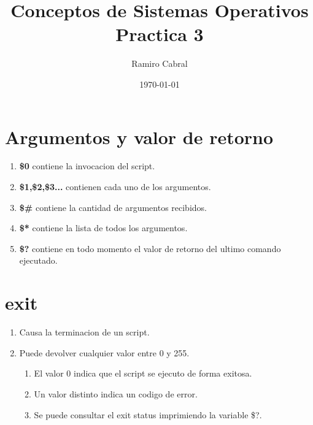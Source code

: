 \documentclass[11pt]{article}
\title{\Huge{Conceptos de Sistemas Operativos\\
Practica 3}}
\author{\huge{Ramiro Cabral}}
\date{\today}
\begin{document}
\maketitle
\pagebreak
\section{Argumentos y valor de retorno}
\begin{enumerate}
    \item \textbf{\$0} contiene la invocacion del script.
    \item \textbf{\$1,\$2,\$3...} contienen cada uno de los argumentos.
    \item \textbf{\$\#} contiene la cantidad de argumentos recibidos.
    \item \textbf{\$*} contiene la lista de todos los argumentos.
    \item \textbf{\$?} contiene en todo momento el valor de retorno del ultimo comando ejecutado.
\end{enumerate}

\section{exit}
\begin{enumerate}
    \item Causa la terminacion de un script.
    \item Puede devolver cualquier valor entre 0 y 255.
    \begin{enumerate}
        \item El valor 0 indica que el script se ejecuto de forma exitosa.
        \item Un valor distinto indica un codigo de error.
        \item Se puede consultar el exit status imprimiendo la variable \$?.
    \end{enumerate}
\end{enumerate}
\end{document}
